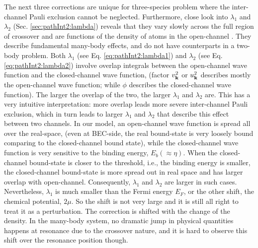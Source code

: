 \begin{unsure}
The next three corrections are unique for three-species problem where the inter-channel Pauli exclusion cannot be neglected.  
Furthermore,  close look into $\lambda_1$ and $\lambda_2$ (Sec. \ref{sec:pathInt2:lambda}) reveals that they vary slowly across the full region of crossover and are functions of the density of atoms in the open-channel .  They describe  fundamental many-body effects, and do not have counterparts in a two-body problem.  
Both $\lambda_{1}$ (see Eq. \ref{eq:pathInt2:lambda1})  and $\lambda_{2}$ (see Eq. \ref{eq:pathInt2:lambda2})  involve overlap integrals between the open-channel wave function and the closed-channel wave function, (factor $v_{\mathbf{k}}^{2}$ or $u_{\mathbf{k}}^{2}$ describes mostly the open-channel wave function; while $\phi$ describes the closed-channel wave function). The larger the overlap of the two, the larger $\lambda_{1}$ and $\lambda_{2}$ are.  This has a very intuitive interpretation:  more overlap leads more severe inter-channel Pauli exclusion, which in turn leads to larger $\lambda_{1}$  and $\lambda_{2}$  that describe this effect between two  channels.  In our model, an open-channel wave function is  spread all over the real-space, (even at BEC-side, the real bound-state is very loosely bound comparing to the closed-channel bound state), while the closed-channel wave function is very sensitive to the binding energy, $E_{b}(\approx\eta)$.  When the closed-channel  bound-state is closer to the threshold, i.e.,  the binding energy  is smaller, the closed-channel bound-state is more spread out  in real space and has larger overlap with open-channel. Consequently,  $\lambda_{1}$ and $\lambda_{2}$ are larger in such cases.                           Nevertheless, $\lambda_1$ is much smaller than the  Fermi energy $E_{F}$, or the other shift, the chemical potential, $2\mu$.  So the shift is not very large and it is still all right to treat it as a perturbation.  The correction is   shifted with the change of the density.  In the many-body system, no dramatic jump in physical quantities happens at resonance due to the crossover nature, and it is hard to observe this shift over the resonance position though.  %



\end{unsure}

